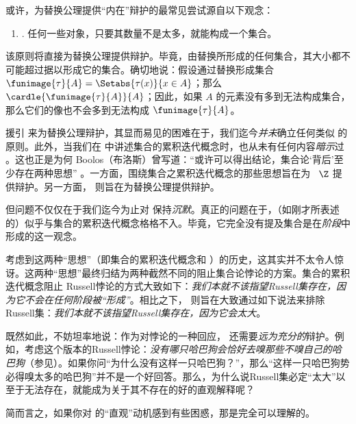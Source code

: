 \documentclass[../../../include/open-logic-section]{subfiles}
\begin{document}

或许，为替换公理提供“内在”辩护的最常见尝试源自以下观念：

\begin{enumerate}
	\item[] \limofsize. 任何一些对象，只要其数量不是太多，就能构成一个集合。
\end{enumerate}

该原则将直接为替换公理提供辩护。毕竟，由替换所形成的任何集合，其大小都不可能超过据以形成它的集合。确切地说：假设通过替换形成集合 $\funimage{\tau}{A} = \Setabs{\tau(x)}{x \in A}$；那么 $\cardle{\funimage{\tau}{A}}{A}$；因此，如果 $A$ 的元素没有多到无法构成集合，那么它们的像也不会多到无法构成 $\funimage{\tau}{A}$。

援引 \limofsize{} 来为替换公理辩护，其显而易见的困难在于，我们迄今\emph{并未}确立任何类似 \limofsize{} 的原则。此外，当我们在  中讲述集合的累积迭代概念时，也从未有任何内容\emph{暗示}过 \limofsize{}。这也正是为何 Boolos（布洛斯）曾写道：“或许可以得出结论，集合论‘背后’至少存在两种思想” \citeyearpar[p.~19]{Boolos1989}。一方面，围绕集合之累积迭代概念的那些思想旨在为 ~$\Z$ 提供辩护。另一方面，\limofsize{} 则旨在为替换公理提供辩护。

但问题不仅仅在于我们迄今为止对 \limofsize{} 保持\emph{沉默}。真正的问题在于，\limofsize{}（如刚才所表述的）似乎与集合的累积迭代概念格格不入。毕竟，它完全没有提及集合是在\emph{阶段}中形成的这一观念。

考虑到这两种“思想”（即集合的累积迭代概念和 \limofsize{}）的历史，这其实并不太令人惊讶。这两种“思想”最终归结为两种截然不同的阻止集合论悖论的方案。集合的累积迭代概念阻止 Russell悖论的方式大致如下：\emph{我们本就不该指望Russell集存在，因为它不会在任何阶段被“形成”}。相比之下，\limofsize{} 则旨在大致通过如下说法来排除Russell集：\emph{我们本就不该指望Russell集存在，因为它会太大}。

既然如此，不妨坦率地说：作为对悖论的一种回应，\limofsize{} 还需要\emph{远为充分的}辩护。例如，考虑这个版本的Russell悖论：\emph{没有哪只哈巴狗会恰好去嗅那些不嗅自己的哈巴狗}（参见）。如果你问“为什么没有这样一只哈巴狗？”，那么“这样一只哈巴狗势必得嗅太多的哈巴狗”并不是一个好回答。那么，为什么说Russell集必定“太大”以至于无法存在，就能成为关于其不存在的好的直观解释呢？

简而言之，如果你对 \limofsize{} 的“直观”动机感到有些困惑，那是完全可以理解的。
\end{document}
